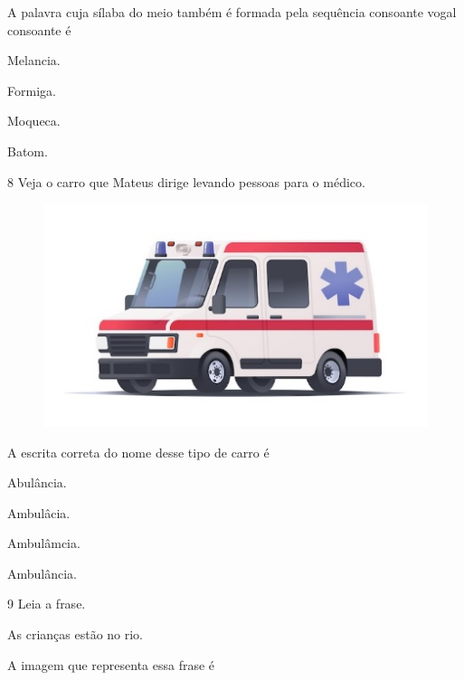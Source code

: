 A palavra cuja sílaba do meio também é formada pela sequência consoante vogal consoante é

\begin{escolha}
\item Melancia.

\item Formiga.

\item Moqueca.

\item Batom.
\end{escolha}

\num{8} Veja o carro que Mateus dirige levando pessoas para o médico.

\begin{figure}[htpb!]
\centering
\includegraphics[width=.5\textwidth]{media/image153.jpeg}
\end{figure}


A escrita correta do nome desse tipo de carro é

\begin{escolha}
\item Abulância.

\item Ambulâcia.

\item Ambulâmcia.

\item Ambulância.
\end{escolha}

\num{9} Leia a frase.

As crianças estão no rio.

A imagem que representa essa frase é

